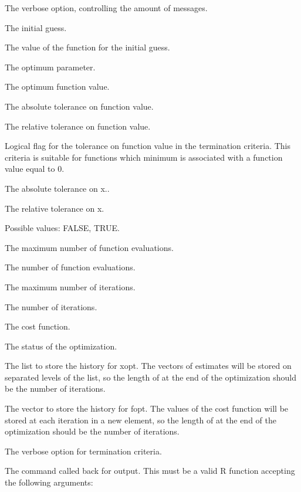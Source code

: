 %
\begin{Arguments}
\begin{ldescription}
\item[\code{verbose}] The verbose option, controlling the amount of messages.
\item[\code{x0}] The initial guess.
\item[\code{fx0}] The value of the function for the initial guess.
\item[\code{xopt}] The optimum parameter.
\item[\code{fopt}] The optimum function value.
\item[\code{tolfunabsolute}] The absolute tolerance on function value.
\item[\code{tolfunrelative}] The relative tolerance on function value.
\item[\code{tolfunmethod}] Logical flag for the tolerance on function value in
the termination criteria. This criteria is suitable for functions which
minimum is associated with a function value equal to 0.
\item[\code{tolxabsolute}] The absolute tolerance on x..
\item[\code{tolxrelative}] The relative tolerance on x.
\item[\code{tolxmethod}] Possible values: FALSE, TRUE.
\item[\code{maxfunevals}] The maximum number of function evaluations.
\item[\code{funevals}] The number of function evaluations.
\item[\code{maxiter}] The maximum number of iterations.
\item[\code{iterations}] The number of iterations.
\item[\code{fun}] The cost function.
\item[\code{status}] The status of the optimization.
\item[\code{historyxopt}] The list to store the history for xopt. The vectors of
estimates will be stored on separated levels of the list, so the length of
 at the end of the optimization should be the number of
iterations.
\item[\code{historyfopt}] The vector to store the history for fopt. The values of
the cost function will be stored at each iteration in a new element, so
the length of  at the end of the optimization should be
the number of iterations.
\item[\code{verbosetermination}] The verbose option for termination criteria.
\item[\code{outputcommand}] The command called back for output. This must be a 
valid R function accepting the following arguments: \begin{description}


\end{description}
\end{ldescription}
\end{Arguments}
